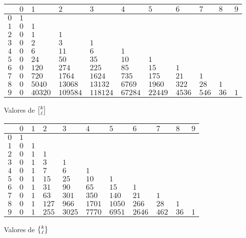 \documentclass{article}
\begin{document}
\vspace{1em}

\begin{center}
{\small
\noindent\begin{tabular}{|f{0.9cm}|f{0.9cm}|f{0.9cm}|f{0.9cm}|f{0.9cm}|f{0.9cm}|f{0.9cm}|f{0.9cm}|f{0.9cm}|f{0.9cm}|f{0.9cm}|}
\hline
{} & $0$ & $1$ & $2$ & $3$ & $4$ & $5$ & $6$ & $7$ & $8$ & $9$ \tabularnewline\hline
$0$ & $1$ &  &  &  &  &  &  &  &  & \tabularnewline\hline
$1$ & $0$ & $1$ &  &  &  &  &  &  &  & \tabularnewline\hline
$2$ & $0$ & $1$ & $1$ &  &  &  &  &  &  & \tabularnewline\hline
$3$ & $0$ & $2$ & $3$ & $1$ &  &  &  &  &  & \tabularnewline\hline
$4$ & $0$ & $6$ & $11$ & $6$ & $1$ &  &  &  &  & \tabularnewline\hline
$5$ & $0$ & $24$ & $50$ & $35$ & $10$ & $1$ &  &  &  & \tabularnewline\hline
$6$ & $0$ & $120$ & $274$ & $225$ & $85$ & $15$ & $1$ &  &  & \tabularnewline\hline
$7$ & $0$ & $720$ & $1764$ & $1624$ & $735$ & $175$ & $21$ & $1$ &  & \tabularnewline\hline
$8$ & $0$ & $5040$ & $13068$ & $13132$ & $6769$ & $1960$ & $322$ & $28$ & $1$ & \tabularnewline\hline
$9$ & $0$ & $40320$ & $109584$ & $118124$ & $67284$ & $22449$ & $4536$ & $546$ & $36$ & $1$ \tabularnewline\hline
\end{tabular}}

\vspace{1em}

\noindent Valores de $\stirling{k}{\ell}$

\vspace{\fill}

{\small
\noindent\begin{tabular}{|f{0.9cm}|f{0.9cm}|f{0.9cm}|f{0.9cm}|f{0.9cm}|f{0.9cm}|f{0.9cm}|f{0.9cm}|f{0.9cm}|f{0.9cm}|f{0.9cm}|}
\hline
{} & $0$ & $1$ & $2$ & $3$ & $4$ & $5$ & $6$ & $7$ & $8$ & $9$ \tabularnewline\hline
$0$ & $1$ &  &  &  &  &  &  &  &  & \tabularnewline\hline
$1$ & $0$ & $1$ &  &  &  &  &  &  &  & \tabularnewline\hline
$2$ & $0$ & $1$ & $1$ &  &  &  &  &  &  & \tabularnewline\hline
$3$ & $0$ & $1$ & $3$ & $1$ &  &  &  &  &  & \tabularnewline\hline
$4$ & $0$ & $1$ & $7$ & $6$ & $1$ &  &  &  &  & \tabularnewline\hline
$5$ & $0$ & $1$ & $15$ & $25$ & $10$ & $1$ &  &  &  & \tabularnewline\hline
$6$ & $0$ & $1$ & $31$ & $90$ & $65$ & $15$ & $1$ &  &  & \tabularnewline\hline
$7$ & $0$ & $1$ & $63$ & $301$ & $350$ & $140$ & $21$ & $1$ &  & \tabularnewline\hline
$8$ & $0$ & $1$ & $127$ & $966$ & $1701$ & $1050$ & $266$ & $28$ & $1$ & \tabularnewline\hline
$9$ & $0$ & $1$ & $255$ & $3025$ & $7770$ & $6951$ & $2646$ & $462$ & $36$ & $1$ \tabularnewline\hline
\end{tabular}}

\vspace{1em}

\noindent Valores de $\Stirling{k}{\ell}$
\end{center}
\end{document}
